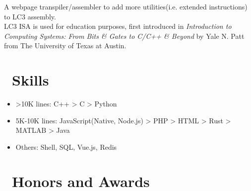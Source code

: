 \documentclass{resume}
\begin{document}
A webpage transpiler/assembler to add more utilities(i.e. extended instructions) to LC3 assembly. \\
LC3 ISA is used for education purposes, first introduced in \textit{Introduction to Computing Systems: From Bits \& Gates to C/C++ \& Beyond} 
by Yale N. Patt from The University of Texas at Austin.


\section{\faCogs\ Skills}
\begin{itemize}[parsep=0.5ex]
  \item >10K lines: C++ > C > Python
  \item 5K-10K lines: JavaScript(Native, Node.js) > PHP > HTML > Rust > MATLAB > Java
  \item Others: Shell, SQL, Vue.js, Redis
\end{itemize}

\section{\faHeartO\ Honors and Awards}
\end{document}
